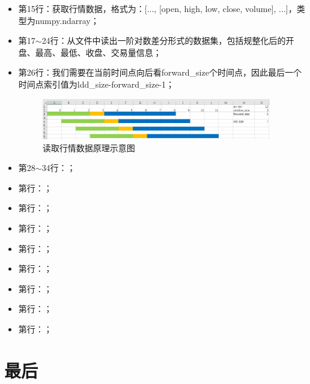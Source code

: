 \begin{itemize}
    \item 第15行：获取行情数据，格式为：[..., [open, high, low, close, volume], ...]，类型为numpy.ndarray；
    \item 第17$\sim$24行：从文件中读出一阶对数差分形式的数据集，包括规整化后的开盘、最高、最低、收盘、交易量信息；
    \item 第26行：我们需要在当前时间点向后看forward\_size个时间点，因此最后一个时间点索引值为ldd\_size-forward\_size-1；
    \begin{figure}[H]
        \caption{读取行情数据原理示意图}
        \label{f000003}
        \centering
        \includegraphics[width=10cm]{images/f000003}
    \end{figure}    
    \item 第28$\sim$34行：；
    \item 第行：；
    \item 第行：；
    \item 第行：；
    \item 第行：；
    \item 第行：；
    \item 第行：；
    \item 第行：；
    \item 第行：；
\end{itemize}

\section{最后}